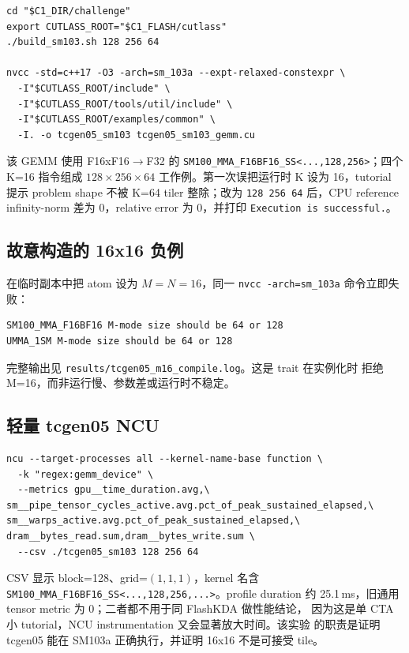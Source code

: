 \documentclass[11pt,a4paper,fontset=none]{ctexart}
\newcommand{\code}[1]{\texttt{#1}}
\begin{document}
\begin{lstlisting}
cd "$C1_DIR/challenge"
export CUTLASS_ROOT="$C1_FLASH/cutlass"
./build_sm103.sh 128 256 64

nvcc -std=c++17 -O3 -arch=sm_103a --expt-relaxed-constexpr \
  -I"$CUTLASS_ROOT/include" \
  -I"$CUTLASS_ROOT/tools/util/include" \
  -I"$CUTLASS_ROOT/examples/common" \
  -I. -o tcgen05_sm103 tcgen05_sm103_gemm.cu
\end{lstlisting}

该 GEMM 使用 F16xF16$\rightarrow$F32 的
\code{SM100\_MMA\_F16BF16\_SS<...,128,256>}；四个 K=16 指令组成
\(128\times256\times64\) 工作例。第一次误把运行时 K 设为 16，tutorial
提示 problem shape 不被 K=64 tiler 整除；改为 \code{128 256 64} 后，CPU
reference infinity-norm 差为 0，relative error 为 0，并打印
\code{Execution is successful.}。

\subsection{故意构造的 16x16 负例}

在临时副本中把 atom 设为 \(M=N=16\)，同一 \code{nvcc -arch=sm\_103a}
命令立即失败：

\begin{lstlisting}
SM100_MMA_F16BF16 M-mode size should be 64 or 128
UMMA_1SM M-mode size should be 64 or 128
\end{lstlisting}

完整输出见 \code{results/tcgen05\_m16\_compile.log}。这是 trait 在实例化时
拒绝 M=16，而非运行慢、参数差或运行时不稳定。

\subsection{轻量 tcgen05 NCU}

\begin{lstlisting}
ncu --target-processes all --kernel-name-base function \
  -k "regex:gemm_device" \
  --metrics gpu__time_duration.avg,\
sm__pipe_tensor_cycles_active.avg.pct_of_peak_sustained_elapsed,\
sm__warps_active.avg.pct_of_peak_sustained_elapsed,\
dram__bytes_read.sum,dram__bytes_write.sum \
  --csv ./tcgen05_sm103 128 256 64
\end{lstlisting}

CSV 显示 block=128、grid=\((1,1,1)\)，kernel 名含
\code{SM100\_MMA\_F16BF16\_SS<...,128,256,...>}。profile duration 约
25.1\,ms，旧通用 tensor metric 为 0；二者都不用于同 FlashKDA 做性能结论，
因为这是单 CTA 小 tutorial，NCU instrumentation 又会显著放大时间。该实验
的职责是证明 tcgen05 能在 SM103a 正确执行，并证明 16x16 不是可接受 tile。
\end{document}
